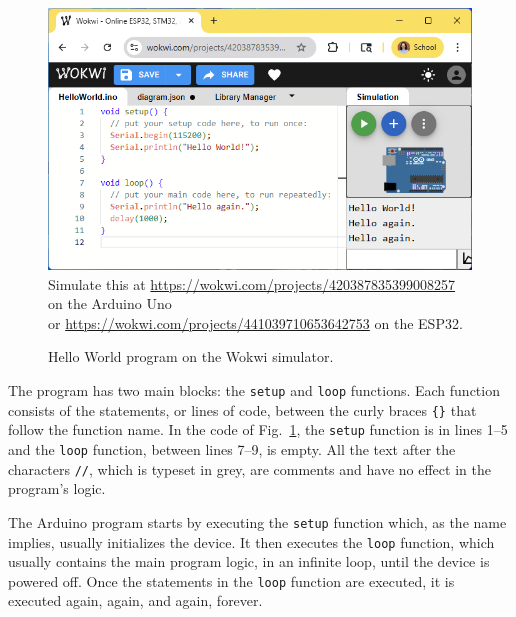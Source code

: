 
\begin{figure}[t]
  \begin{wide}
    \includegraphics[width=\textwidth]{img/wokwi-hello.png}
    \\ \scriptsize
    Simulate this at \url{https://wokwi.com/projects/420387835399008257} on the Arduino Uno \\
    or \url{https://wokwi.com/projects/441039710653642753} on the ESP32.
    \caption{Hello World program on the Wokwi simulator.}
    \label{fig:wokwi-hello}
  \end{wide}
\end{figure}

The program has two main blocks: the \texttt{setup} and \texttt{loop} functions.
Each function consists of the statements, or lines of code, between the curly braces \texttt{\{\}} that follow the function name.
In the code of Fig.~\ref{fig:wokwi-hello}, the \texttt{setup} function is in lines 1--5 and the \texttt{loop} function, between lines 7--9, is empty.
All the text after the characters \texttt{//}, which is typeset in grey, are comments and have no effect in the program's logic.

The Arduino program starts by executing the \texttt{setup} function which, as the name implies, usually initializes the device.
It then executes the \texttt{loop} function, which usually contains the main program logic, in an infinite loop, until the device is powered off.
Once the statements in the \texttt{loop} function are executed, it is executed again, again, and again, forever.

